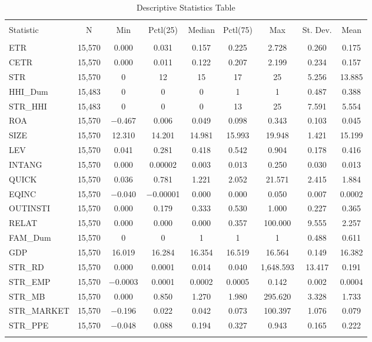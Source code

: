 \documentclass[a4paper,14pt]{article}\usepackage[]{graphicx}\usepackage[]{color}
\begin{document}
\begin{table}[h!] \centering 
  \caption{Descriptive Statistics Table} 
  \label{} 
\begin{tabular}{@{\extracolsep{5pt}}lcccccccc} 
\\[-1.8ex]\hline 
\hline \\[-1.8ex] 
Statistic & \multicolumn{1}{c}{N} & \multicolumn{1}{c}{Min} & \multicolumn{1}{c}{Pctl(25)} & \multicolumn{1}{c}{Median} & \multicolumn{1}{c}{Pctl(75)} & \multicolumn{1}{c}{Max} & \multicolumn{1}{c}{St. Dev.} & \multicolumn{1}{c}{Mean} \\ 
\hline \\[-1.8ex] 
ETR & 15,570 & 0.000 & 0.031 & 0.157 & 0.225 & 2.728 & 0.260 & 0.175 \\ 
CETR & 15,570 & 0.000 & 0.011 & 0.122 & 0.207 & 2.199 & 0.234 & 0.157 \\ 
STR & 15,570 & 0 & 12 & 15 & 17 & 25 & 5.256 & 13.885 \\ 
HHI\_Dum & 15,483 & 0 & 0 & 0 & 1 & 1 & 0.487 & 0.388 \\ 
STR\_HHI & 15,483 & 0 & 0 & 0 & 13 & 25 & 7.591 & 5.554 \\ 
ROA & 15,570 & $-$0.467 & 0.006 & 0.049 & 0.098 & 0.343 & 0.103 & 0.045 \\ 
SIZE & 15,570 & 12.310 & 14.201 & 14.981 & 15.993 & 19.948 & 1.421 & 15.199 \\ 
LEV & 15,570 & 0.041 & 0.281 & 0.418 & 0.542 & 0.904 & 0.178 & 0.416 \\ 
INTANG & 15,570 & 0.000 & 0.00002 & 0.003 & 0.013 & 0.250 & 0.030 & 0.013 \\ 
QUICK & 15,570 & 0.036 & 0.781 & 1.221 & 2.052 & 21.571 & 2.415 & 1.884 \\ 
EQINC & 15,570 & $-$0.040 & $-$0.00001 & 0.000 & 0.000 & 0.050 & 0.007 & 0.0002 \\ 
OUTINSTI & 15,570 & 0.000 & 0.179 & 0.333 & 0.530 & 1.000 & 0.227 & 0.365 \\ 
RELAT & 15,570 & 0.000 & 0.000 & 0.000 & 0.357 & 100.000 & 9.555 & 2.257 \\ 
FAM\_Dum & 15,570 & 0 & 0 & 1 & 1 & 1 & 0.488 & 0.611 \\ 
GDP & 15,570 & 16.019 & 16.284 & 16.354 & 16.519 & 16.564 & 0.149 & 16.382 \\ 
STR\_RD & 15,570 & 0.000 & 0.0001 & 0.014 & 0.040 & 1,648.593 & 13.417 & 0.191 \\ 
STR\_EMP & 15,570 & $-$0.0003 & 0.0001 & 0.0002 & 0.0005 & 0.142 & 0.002 & 0.0004 \\ 
STR\_MB & 15,570 & 0.000 & 0.850 & 1.270 & 1.980 & 295.620 & 3.328 & 1.733 \\ 
STR\_MARKET & 15,570 & $-$0.196 & 0.022 & 0.042 & 0.073 & 100.397 & 1.076 & 0.079 \\ 
STR\_PPE & 15,570 & $-$0.048 & 0.088 & 0.194 & 0.327 & 0.943 & 0.165 & 0.222 \\ 
\hline \\[-1.8ex] 
\end{tabular} 
\end{table} 
\end{document}
